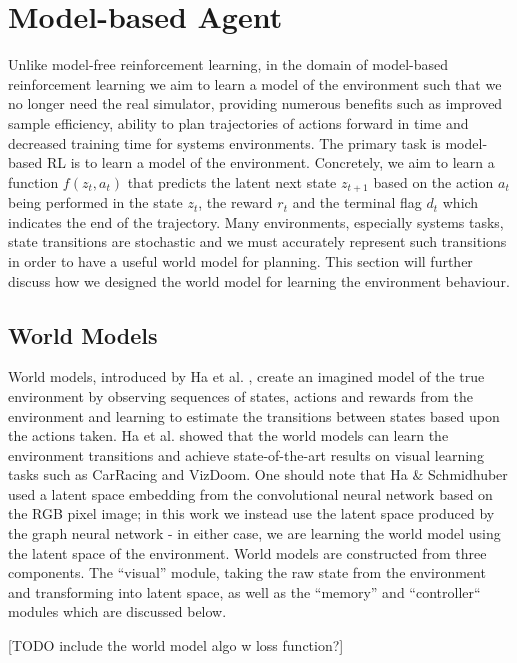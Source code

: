 \section{Model-based Agent}
\label{sec:rlopt:subsec:mb-agent}
Unlike model-free reinforcement learning, in the domain of model-based reinforcement learning we aim to learn a model of the environment such that we no longer need the real simulator, providing numerous benefits such as improved sample efficiency, ability to plan trajectories of actions forward in time and decreased training time for systems environments. The primary task is model-based RL is to learn a model of the environment. Concretely, we aim to learn a function $f(z_t, a_t)$ that predicts the latent next state $z_{t+1}$ based on the action $a_t$ being performed in the state $z_t$, the reward $r_t$ and the terminal flag $d_t$ which indicates the end of the trajectory. Many environments, especially systems tasks, state transitions are stochastic and we must accurately represent such transitions in order to have a useful world model for planning. This section will further discuss how we designed the world model for learning the environment behaviour.

\subsection{World Models}
World models, introduced by Ha et al. \cite{ha2018worldmodels}, create an imagined model of the true environment by observing sequences of states, actions and rewards from the environment and learning to estimate the transitions between states based upon the actions taken. Ha et al. showed that the world models can learn the environment transitions and achieve state-of-the-art results on visual learning tasks such as CarRacing and VizDoom. One should note that Ha \& Schmidhuber used  a latent space embedding from the convolutional neural network based on the RGB pixel image; in this work we instead use the latent space produced by the graph neural network - in either case, we are learning the world model using the latent space of the environment. World models are constructed from three components. The ``visual'' module, taking the raw state from the environment and transforming into latent space, as well as the ``memory''  and ``controller`` modules which are discussed below.

[TODO include the world model algo w loss function?]

